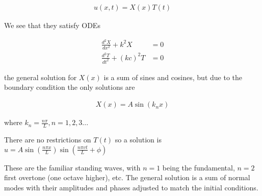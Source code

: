 \documentclass{article}
\begin{document}
\begin{align}
u(x,t) = X(x)T(t)
\end{align}

We see that they satisfy ODEs

\begin{align}
\frac{d^2 X}{d x^2} + k^2X &= 0 \\
\frac{d^2 T}{d t^2} + (kc)^2T &= 0
\end{align}

the general solution for $X(x)$ is a sum of sines and cosines, but due to the boundary condition the only solutions are

\begin{align}
X(x) = A \sin(k_nx)
\end{align}

where $k_n = \frac{n\pi}{L}, n = 1,2,3...$

There are no restrictions on $T(t)$ so a solution is $u = A\sin(\frac{n\pi x}{L})\sin(\frac{n\pi vt}{L} + \phi)$

These are the familiar standing waves, with $n=1$ being the fundamental, $n=2$ first overtone (one octave higher), etc. The general solution is a sum of normal modes with their amplitudes and phases adjusted to match the initial conditions.
\end{document}
